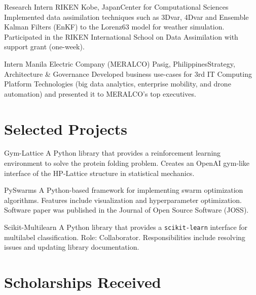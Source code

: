 \documentclass[11pt,a4paper,sans]{moderncv}
\begin{document}
        {Research Intern}
        {RIKEN}
        {Kobe, Japan}{Center for Computational Sciences}
        {
        Implemented data assimilation techniques such as 3Dvar,
        4Dvar and Ensemble Kalman Filters (EnKF) to the Lorenz63 model
        for weather simulation. Participated in the RIKEN International
        School on Data Assimilation with support grant (one-week).
        }

        {Intern}
        {Manila Electric Company (MERALCO)}
        {Pasig, Philippines}{Strategy, Architecture \& Governance}
        {
        Developed business use-cases for 3rd IT Computing Platform
        Technologies (big data analytics, enterprise mobility, and drone
        automation) and presented it to MERALCO's top executives.
        }

\section{Selected Projects}

        {\color{blue} }
        {Gym-Lattice}{}{}
        {
        A Python library that provides a reinforcement learning environment
        to solve the protein folding problem. Creates an OpenAI gym-like
        interface of the HP-Lattice structure in statistical mechanics.
        }

        {\color{blue} }
        {PySwarms}{}{}
        {
        A Python-based framework for implementing swarm optimization
        algorithms. Features include visualization and hyperparameter
        optimization. Software paper was published in the Journal of Open
        Source Software (JOSS).
        }

        {\color{blue} }
        {Scikit-Multilearn}{}{}
        {
        A Python library that provides a \texttt{scikit-learn} interface for
        multilabel classification. Role: Collaborator. Responsibilities include
        resolving issues and updating library documentation.
        }

\section{Scholarships Received}
\nocite{*}


\end{document}
